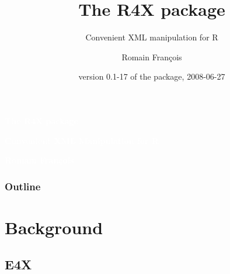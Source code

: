 \documentclass[smaller]{beamer}
\title{The R4X package}
\subtitle{Convenient XML manipulation for R}
\author{Romain Fran\c{c}ois}
\date{ version 0.1-17 of the package, 2008-06-27 }
\begin{document}
{
 \begin{frame}[fragile][plain]
\begin{center}

\begin{Huge}\textcolor{white}{\sf \bfseries The R4X package}\end{Huge}

\begin{Large}\textcolor{white}{\sf \bfseries Convenient XML Manipulation for R}\end{Large}
 
\end{center}

\begin{flushright}
 \begin{Large}
\textcolor{white}{\sf \bfseries Romain Fran\c{c}ois}  
 \end{Large}
\end{flushright}


 \end{frame}
}


\begin{frame}[fragile]
\frametitle{Outline}
\tableofcontents
\end{frame}

\section{Background}

\subsection{E4X}
\end{document}
